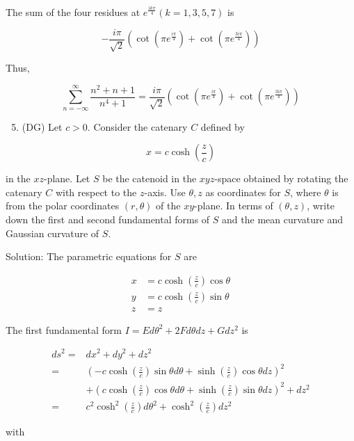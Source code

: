 \documentclass[10pt]{article}
\begin{document}
The sum of the four residues at $e^{\frac{i k \pi}{4}}(k=1,3,5,7)$ is

$$
-\frac{i \pi}{\sqrt{2}}\left(\cot \left(\pi e^{\frac{i \pi}{4}}\right)+\cot \left(\pi e^{\frac{3 i \pi}{4}}\right)\right)
$$

Thus,

$$
\sum_{n=-\infty}^{\infty} \frac{n^{2}+n+1}{n^{4}+1}=\frac{i \pi}{\sqrt{2}}\left(\cot \left(\pi e^{\frac{i \pi}{4}}\right)+\cot \left(\pi e^{\frac{3 i \pi}{4}}\right)\right)
$$

\begin{enumerate}
  \setcounter{enumi}{4}
  \item (DG) Let $c>0$. Consider the catenary $C$ defined by
\end{enumerate}

$$
x=c \cosh \left(\frac{z}{c}\right)
$$

in the $x z$-plane. Let $S$ be the catenoid in the $x y z$-space obtained by rotating the catenary $C$ with respect to the $z$-axis. Use $\theta, z$ as coordinates for $S$, where $\theta$ is from the polar coordinates $(r, \theta)$ of the $x y$-plane. In terms of $(\theta, z)$, write down the first and second fundamental forms of $S$ and the mean curvature and Gaussian curvature of $S$.

Solution: The parametric equations for $S$ are

$$
\begin{aligned}
x & =c \cosh \left(\frac{z}{c}\right) \cos \theta \\
y & =c \cosh \left(\frac{z}{c}\right) \sin \theta \\
z & =z
\end{aligned}
$$

The first fundamental form $I=E d \theta^{2}+2 F d \theta d z+G d z^{2}$ is

$$
\begin{aligned}
d s^{2}= & d x^{2}+d y^{2}+d z^{2} \\
= & \left(-c \cosh \left(\frac{z}{c}\right) \sin \theta d \theta+\sinh \left(\frac{z}{c}\right) \cos \theta d z\right)^{2} \\
& +\left(c \cosh \left(\frac{z}{c}\right) \cos \theta d \theta+\sinh \left(\frac{z}{c}\right) \sin \theta d z\right)^{2}+d z^{2} \\
= & c^{2} \cosh ^{2}\left(\frac{z}{c}\right) d \theta^{2}+\cosh ^{2}\left(\frac{z}{c}\right) d z^{2}
\end{aligned}
$$

with
\end{document}
